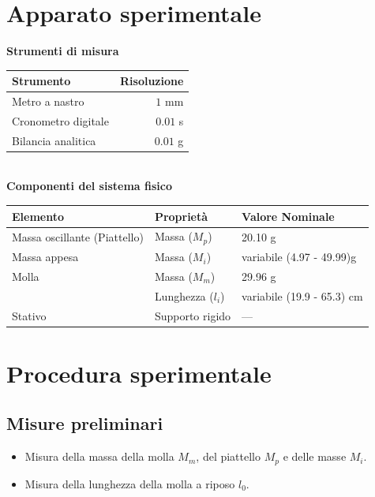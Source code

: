 \documentclass[a4paper,12pt]{article}
\begin{document}
\section{Apparato sperimentale}
\textbf{Strumenti di misura}
\begin{table}[htbp]
    \centering
    \begin{tabular}{lr} %
        \toprule
        \textbf{Strumento} & \textbf{Risoluzione} \\
        \midrule
        Metro a nastro      & $1$ mm               \\
        Cronometro digitale & $0.01$ s             \\
        Bilancia analitica    & $0.01$ g              \\
        \bottomrule
    \end{tabular}
\end{table}\\
\textbf{Componenti del sistema fisico}
\begin{table}[htbp]
    \centering
    \footnotesize
    \vspace{8pt} %
    \begin{tabular}{lll}
        \toprule
        \textbf{Elemento} & \textbf{Proprietà} & \textbf{Valore Nominale} \\
        \midrule
        Massa oscillante (Piattello) & Massa ($M_p$)     & 20.10 g                \\
        Massa appesa                 & Massa ($M_i$)  & variabile (4.97 - 49.99)g \\
        \addlinespace
        Molla      & Massa ($M_m$)     &  29.96 g                  \\
                                 & Lunghezza ($l_i$) & variabile (19.9 - 65.3) cm           \\
        \addlinespace
        Stativo                  & Supporto rigido   & ---                    \\
        \bottomrule
    \end{tabular}
\end{table}

\section{Procedura sperimentale}
\subsection{Misure preliminari}
\begin{itemize}
    \item Misura della massa della molla $M_m$, del piattello $M_p$ e delle masse $M_i$.
    \item Misura della lunghezza della molla a riposo $l_0$.
\end{itemize}
\end{document}
